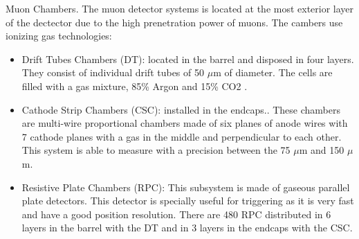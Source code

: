 \documentclass[8pt]{beamer}
\begin{document}
\begin{frame}[fragile]{Muon Chambers.}
	The muon detector systems is located at the most exterior layer of the dectector due to the high prenetration power of muons. The cambers use ionizing gas technologies:
	

		\begin{itemize}
			\item  Drift Tubes Chambers (DT): located in the barrel and disposed in four layers. They consist of individual drift tubes of 50 $\mu$m of diameter. The cells are filled with a gas mixture,
			85\% Argon and 15\% CO2 .
			
						
			\item  Cathode Strip Chambers (CSC): installed in the endcaps.. These chambers are multi-wire proportional chambers made of six planes of anode wires with 7 cathode planes with a gas in the middle and perpendicular to each other. This system is able to measure with a precision between the 75 $\mu$m and 150 $\mu$m.
			\item  Resistive Plate Chambers (RPC): This subsystem is made of gaseous parallel plate detectors. This detector is specially useful for triggering as it is very fast and have a good position resolution. There are 480 RPC distributed in	6 layers in the barrel with the DT and in 3 layers in the endcaps with the CSC.
			
		\end{itemize}
		
		
\end{frame}
\end{document}
